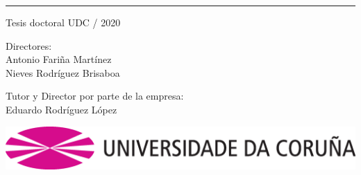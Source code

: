 \begin{titlepage}


\vspace*{0.9cm}


\vspace*{1.5cm}



\noindent \textcolor{rosaudc}{\rule{\textwidth}{2mm}}

{\large
  \noindent Tesis doctoral UDC / 2020

  \vspace*{1.5cm}

  \noindent Directores: \\Antonio Fari\~na Mart\'inez \\ Nieves Rodr\'iguez Brisaboa
  
  \vspace*{1.0cm}
  
  \noindent Tutor y Director por parte de la empresa: \\Eduardo Rodr\'iguez L\'opez

  \vspace*{1.5cm}

}

\begin{center}
  \vspace*{1.9cm}
  \includegraphics[scale=0.20]{figures/_init/udc-color}
\end{center}


\end{titlepage}

\thispagestyle{empty}

